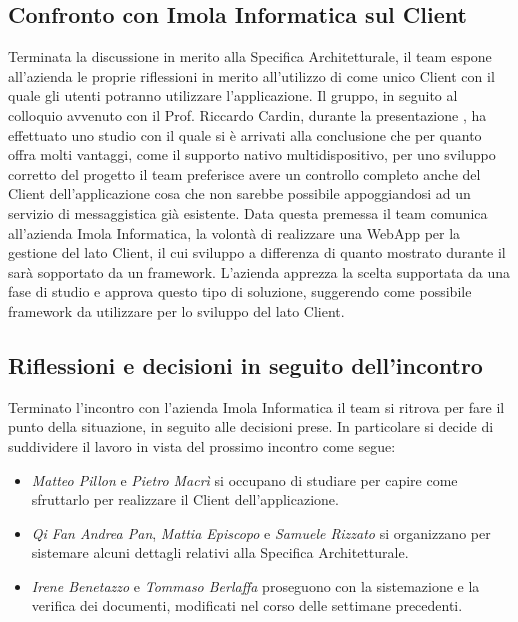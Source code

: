 \subsection{Confronto con Imola Informatica sul Client}
Terminata la discussione in merito alla Specifica Architetturale, il team espone all'azienda le proprie riflessioni in merito all'utilizzo di  come unico Client con il quale gli utenti potranno utilizzare l'applicazione. \newline
Il gruppo, in seguito al colloquio avvenuto con il Prof. Riccardo Cardin, durante la presentazione , ha effettuato uno studio con il quale si è arrivati alla conclusione che per quanto  offra molti vantaggi, come il supporto nativo multidispositivo, per uno sviluppo corretto del progetto il team preferisce avere un controllo completo anche del Client dell'applicazione cosa che non sarebbe possibile appoggiandosi ad un servizio di messaggistica già esistente. \newline
Data questa premessa il team comunica all'azienda Imola Informatica, la volontà di realizzare una WebApp per la gestione del lato Client, il cui sviluppo a differenza di quanto mostrato durante il  sarà sopportato da un framework. 
L'azienda apprezza la scelta supportata da una fase di studio e approva questo tipo di soluzione, suggerendo  come possibile framework da utilizzare per lo sviluppo del lato Client. 

\newpage
\subsection{Riflessioni e decisioni in seguito dell'incontro}
Terminato l'incontro con l'azienda Imola Informatica il team si ritrova per fare il punto della situazione, in seguito alle decisioni prese. In particolare si decide di suddividere il lavoro in vista del prossimo incontro come segue: 
\begin{itemize}
    \item \textit{Matteo Pillon} e \textit{Pietro Macrì} si occupano di studiare  per capire come sfruttarlo per realizzare il Client dell'applicazione. 
    \item \textit{Qi Fan Andrea Pan}, \textit{Mattia Episcopo} e \textit{Samuele Rizzato} si organizzano per sistemare alcuni dettagli relativi alla Specifica Architetturale.
    \item \textit{Irene Benetazzo} e \textit{Tommaso Berlaffa} proseguono con la sistemazione e la verifica dei documenti, modificati nel corso delle settimane precedenti.
\end{itemize}
  